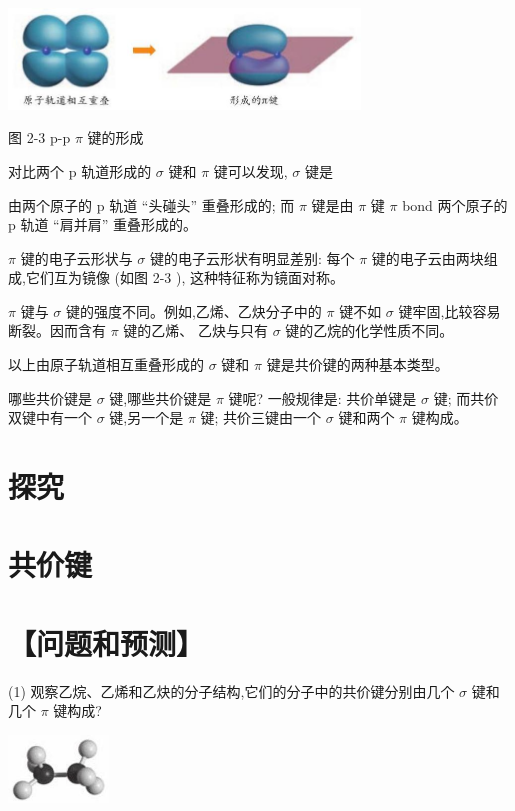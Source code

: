 \documentclass[10pt]{article}
\begin{document}
\begin{center}
\includegraphics[max width=0.7\textwidth]{images/0190e026-5a11-7df7-bd27-54d09026ba7a_38_912017.jpg}
\end{center}

图 2-3 p-p \(\pi\) 键的形成

对比两个 \(\mathrm{p}\) 轨道形成的 \(\sigma\) 键和 \(\pi\) 键可以发现, \(\sigma\) 键是

由两个原子的 \(\mathrm{p}\) 轨道 “头碰头” 重叠形成的; 而 \(\pi\) 键是由 \(\pi\) 键 \(\pi\) bond 两个原子的 \(\mathrm{p}\) 轨道 “肩并肩” 重叠形成的。

\(\pi\) 键的电子云形状与 \(\sigma\) 键的电子云形状有明显差别: 每个 \(\pi\) 键的电子云由两块组成,它们互为镜像 (如图 2-3 ), 这种特征称为镜面对称。

\(\pi\) 键与 \(\sigma\) 键的强度不同。例如,乙烯、乙炔分子中的 \(\pi\) 键不如 \(\sigma\) 键牢固,比较容易断裂。因而含有 \(\pi\) 键的乙烯、 乙炔与只有 \(\sigma\) 键的乙烷的化学性质不同。

以上由原子轨道相互重叠形成的 \(\sigma\) 键和 \(\pi\) 键是共价键的两种基本类型。

哪些共价键是 \(\sigma\) 键,哪些共价键是 \(\pi\) 键呢? 一般规律是: 共价单键是 \(\sigma\) 键; 而共价双键中有一个 \(\sigma\) 键,另一个是 \(\pi\) 键; 共价三键由一个 \(\sigma\) 键和两个 \(\pi\) 键构成。

\section*{探究}

\section*{共价键}

\section*{【问题和预测】}

(1) 观察乙烷、乙烯和乙炔的分子结构,它们的分子中的共价键分别由几个 \(\sigma\) 键和几个 \(\pi\) 键构成?

\begin{center}
\includegraphics[max width=0.2\textwidth]{images/0190e026-5a11-7df7-bd27-54d09026ba7a_39_920145.jpg}
\end{center}
\end{document}
